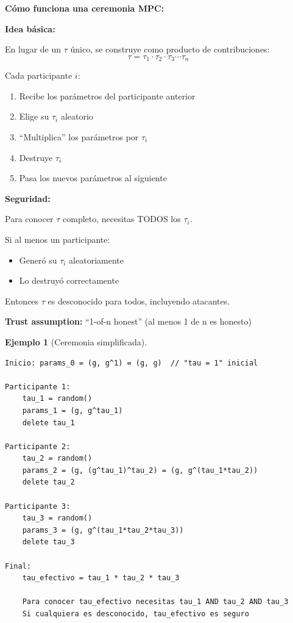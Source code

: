 \documentclass[11pt,a4paper,twoside,openright]{book}
\theoremstyle{definition}
\newtheorem{example}{Ejemplo}[chapter]
\theoremstyle{plain}
\theoremstyle{remark}
\begin{document}
\begin{keyidea}
\textbf{Cómo funciona una ceremonia MPC:}

\textbf{Idea básica:}

En lugar de un $\tau$ único, se construye como producto de contribuciones:
\[ \tau = \tau_1 \cdot \tau_2 \cdot \tau_3 \cdots \tau_n \]

Cada participante $i$:
\begin{enumerate}
    \item Recibe los parámetros del participante anterior
    \item Elige su $\tau_i$ aleatorio
    \item ``Multiplica'' los parámetros por $\tau_i$
    \item Destruye $\tau_i$
    \item Pasa los nuevos parámetros al siguiente
\end{enumerate}

\textbf{Seguridad:}

Para conocer $\tau$ completo, necesitas TODOS los $\tau_i$.

Si al menos un participante:
\begin{itemize}
    \item Generó su $\tau_i$ aleatoriamente
    \item Lo destruyó correctamente
\end{itemize}

Entonces $\tau$ es desconocido para todos, incluyendo atacantes.

\textbf{Trust assumption:} ``1-of-n honest'' (al menos 1 de n es honesto)
\end{keyidea}

\begin{example}[Ceremonia simplificada]
\begin{verbatim}
Inicio: params_0 = (g, g^1) = (g, g)  // "tau = 1" inicial

Participante 1:
    tau_1 = random()
    params_1 = (g, g^tau_1)
    delete tau_1

Participante 2:
    tau_2 = random()
    params_2 = (g, (g^tau_1)^tau_2) = (g, g^(tau_1*tau_2))
    delete tau_2

Participante 3:
    tau_3 = random()
    params_3 = (g, g^(tau_1*tau_2*tau_3))
    delete tau_3

Final:
    tau_efectivo = tau_1 * tau_2 * tau_3
    
    Para conocer tau_efectivo necesitas tau_1 AND tau_2 AND tau_3
    Si cualquiera es desconocido, tau_efectivo es seguro
\end{verbatim}
\end{example}
\end{document}
